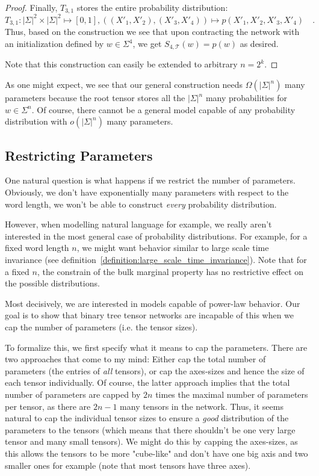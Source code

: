\documentclass[../../main.tex]{subfiles}
\begin{document}
\begin{proof}
    Finally, $T_{3, 1}$ stores the entire probability distribution:
    \[
        T_{3, 1}: |\Sigma|^2 \times |\Sigma|^2 \mapsto [0, 1], ((X'_1, X'_2), (X'_3, X'_4)) \mapsto p(X'_1, X'_2, X'_3, X'_4) \quad .
    \]
    Thus, based on the construction we see that upon contracting the network with an initialization defined by $w \in \Sigma^4$, we get $S_{4, \mathcal{T}}(w) = p(w)$ as desired.

    Note that this construction can easily be extended to arbitrary $n = 2^k$.
    \end{proof}

    As one might expect, we see that our general construction needs $\Omega(|\Sigma|^n)$ many parameters because the root tensor stores all the $|\Sigma|^n$ many probabilities for $w \in \Sigma^n$. Of course, there cannot be a general model capable of any probability distribution with $o(|\Sigma|^n)$ many parameters.

\subsection{Restricting Parameters}
    One natural question is what happens if we restrict the number of parameters. Obviously, we don't have exponentially many parameters with respect to the word length, we won't be able to construct \emph{every} probability distribution.

    However, when modelling natural language for example, we really aren't interested in the most general case of probability distributions. For example, for a fixed word length $n$, we might want behavior similar to large scale time invariance (see definition~\ref{definition:large_scale_time_invariance}). Note that for a fixed $n$, the constrain of the bulk marginal property has no restrictive effect on the possible distributions.

    Most decisively, we are interested in models capable of power-law behavior. Our goal is to show that binary tree tensor networks are incapable of this when we cap the number of parameters (i.e. the tensor sizes).

    To formalize this, we first specify what it means to cap the parameters. There are two approaches that come to my mind: Either cap the total number of parameters (the entries of \emph{all} tensors), or cap the axes-sizes and hence the size of each tensor individually. Of course, the latter approach implies that the total number of parameters are capped by $2n$ times the maximal number of parameters per tensor, as there are $2n-1$ many tensors in the network. Thus, it seems natural to cap the individual tensor sizes to ensure a \emph{good} distribution of the parameters to the tensors (which means that there shouldn't be one very large tensor and many small tensors). We might do this by capping the axes-sizes, as this allows the tensors to be more "cube-like" and don't have one big axis and two smaller ones for example (note that most tensors have three axes).
\end{document}
